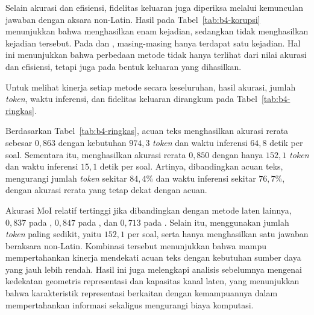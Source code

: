 Selain akurasi dan efisiensi, fidelitas keluaran juga diperiksa melalui
kemunculan jawaban dengan aksara non-Latin. Hasil pada
Tabel~\ref{tab:b4-korupsi} menunjukkan bahwa  menghasilkan enam
kejadian, sedangkan  tidak menghasilkan kejadian tersebut.
Pada  dan , masing-masing hanya terdapat satu kejadian.
Hal ini menunjukkan bahwa perbedaan metode tidak hanya terlihat dari nilai
akurasi dan efisiensi, tetapi juga pada bentuk keluaran yang dihasilkan.



Untuk melihat kinerja setiap metode secara keseluruhan, hasil akurasi,
jumlah \textit{token}, waktu inferensi, dan fidelitas keluaran dirangkum pada
Tabel~\ref{tab:b4-ringkas}.



Berdasarkan Tabel~\ref{tab:b4-ringkas}, acuan teks menghasilkan akurasi rerata
sebesar $0{,}863$ dengan kebutuhan $974{,}3$ \textit{token} dan waktu
inferensi $64{,}8$ detik per soal. Sementara itu,  menghasilkan
akurasi rerata $0{,}850$ dengan hanya $152{,}1$ \textit{token} dan waktu
inferensi $15{,}1$ detik per soal. Artinya, dibandingkan acuan teks,
 mengurangi jumlah \textit{token} sekitar $84{,}4\%$ dan waktu
inferensi sekitar $76{,}7\%$, dengan akurasi rerata yang tetap dekat dengan
acuan.

Akurasi MoI relatif tertinggi jika dibandingkan dengan metode laten lainnya, $0{,}837$ pada ,
$0{,}847$ pada , dan $0{,}713$ pada . Selain itu,
 menggunakan jumlah \textit{token} paling sedikit, yaitu $152{,}1$
per soal, serta hanya menghasilkan satu jawaban beraksara non-Latin.
Kombinasi tersebut menunjukkan bahwa  mampu mempertahankan kinerja
mendekati acuan teks dengan kebutuhan sumber daya yang jauh lebih
rendah. Hasil ini juga melengkapi analisis sebelumnya mengenai kedekatan
geometris representasi dan kapasitas kanal laten, yang menunjukkan bahwa
karakteristik representasi  berkaitan dengan kemampuannya dalam
mempertahankan informasi sekaligus mengurangi biaya komputasi.